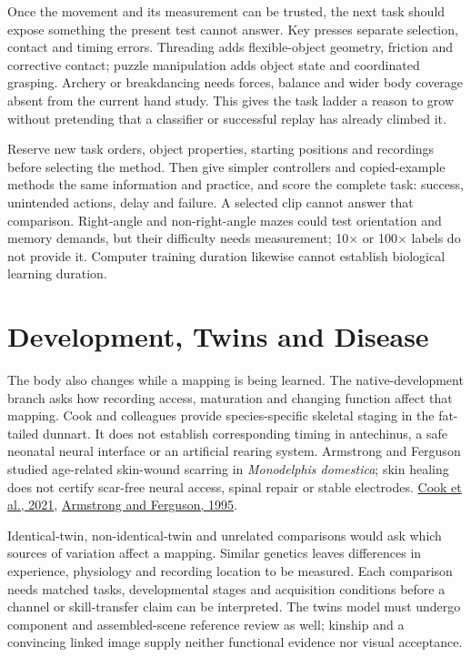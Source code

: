 Once the movement and its measurement can be trusted, the next task should expose something the present test cannot answer. Key presses separate selection, contact and timing errors. Threading adds flexible-object geometry, friction and corrective contact; puzzle manipulation adds object state and coordinated grasping. Archery or breakdancing needs forces, balance and wider body coverage absent from the current hand study. This gives the task ladder a reason to grow without pretending that a classifier or successful replay has already climbed it.\par

Reserve new task orders, object properties, starting positions and recordings before selecting the method. Then give simpler controllers and copied-example methods the same information and practice, and score the complete task: success, unintended actions, delay and failure. A selected clip cannot answer that comparison. Right-angle and non-right-angle mazes could test orientation and memory demands, but their difficulty needs measurement; 10\ensuremath{\times} or 100\ensuremath{\times} labels do not provide it. Computer training duration likewise cannot establish biological learning duration.\par

\section{Development, Twins and Disease}

The body also changes while a mapping is being learned. The native-development branch asks how recording access, maturation and changing function affect that mapping. Cook and colleagues provide species-specific skeletal staging in the fat-tailed dunnart. It does not establish corresponding timing in antechinus, a safe neonatal neural interface or an artificial rearing system. Armstrong and Ferguson studied age-related skin-wound scarring in \emph{Monodelphis domestica}; skin healing does not certify scar-free neural access, spinal repair or stable electrodes. \href{https://www.nature.com/articles/s42003-021-02506-2}{Cook et al., 2021}, \href{https://pubmed.ncbi.nlm.nih.gov/7750642/}{Armstrong and Ferguson, 1995}.\par

Identical-twin, non-identical-twin and unrelated comparisons would ask which sources of variation affect a mapping. Similar genetics leaves differences in experience, physiology and recording location to be measured. Each comparison needs matched tasks, developmental stages and acquisition conditions before a channel or skill-transfer claim can be interpreted. The twins model must undergo component and assembled-scene reference review as well; kinship and a convincing linked image supply neither functional evidence nor visual acceptance.\par

